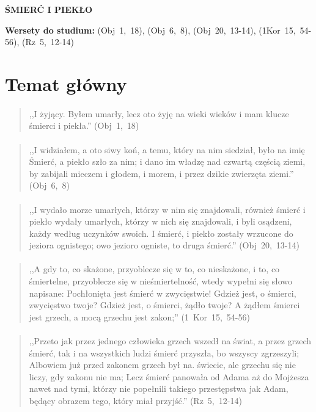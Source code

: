 \documentclass[10pt,a4paper,oneside]{article}
\begin{document}
\centerline{\textbf{\MakeUppercase{Śmierć i Piekło}}}
\begin{center}
\textbf{Wersety do studium:} \mbox{(Obj 1, 18)}, \mbox{(Obj 6, 8)}, \mbox{(Obj 20, 13-14)}, \mbox{(1Kor 15, 54-56)}, \mbox{(Rz 5, 12-14)}
\end{center}
\section{Temat główny}
\paragraph{}
\begin{quote}
,,I żyjący. Byłem umarły, lecz oto żyję na wieki wieków i mam klucze śmierci i piekła.'' \mbox{(Obj 1, 18)}
\end{quote}
\paragraph{}
\begin{quote}
,,I widziałem, a oto siwy koń, a temu, który na nim siedział, było na imię Śmierć, a piekło szło za nim; i dano im władzę nad czwartą częścią ziemi, by zabijali mieczem i głodem, i morem, i przez dzikie zwierzęta ziemi.'' \mbox{(Obj 6, 8)}
\end{quote}
\paragraph{}
\begin{quote}
,,I wydało morze umarłych, którzy w nim się znajdowali, również śmierć i piekło wydały umarłych, którzy w nich się znajdowali, i byli osądzeni, każdy według uczynków swoich. I śmierć, i piekło zostały wrzucone do jeziora ognistego; owo jezioro ogniste, to druga śmierć.'' \mbox{(Obj 20, 13-14)}
\end{quote}
\paragraph{}
\begin{quote}
,,A gdy to, co skażone, przyoblecze się w to, co nieskażone, i to, co śmiertelne, przyoblecze się w nieśmiertelność, wtedy wypełni się słowo napisane: Pochłonięta jest śmierć w zwycięstwie! Gdzież jest, o śmierci, zwycięstwo twoje? Gdzież jest, o śmierci, żądło twoje? A żądłem śmierci jest grzech, a mocą grzechu jest zakon;'' \mbox{(1 Kor 15, 54-56)}
\end{quote}
\paragraph{}
\begin{quote}
,,Przeto jak przez jednego człowieka grzech wszedł na świat, a przez grzech śmierć, tak i na wszystkich ludzi śmierć przyszła, bo wszyscy zgrzeszyli; Albowiem już przed zakonem grzech był na. świecie, ale grzechu się nie liczy, gdy zakonu nie ma; Lecz śmierć panowała od Adama aż do Mojżesza nawet nad tymi, którzy nie popełnili takiego przestępstwa jak Adam, będący obrazem tego, który miał przyjść.'' \mbox{(Rz 5, 12-14)}
\end{quote}
\end{document}
